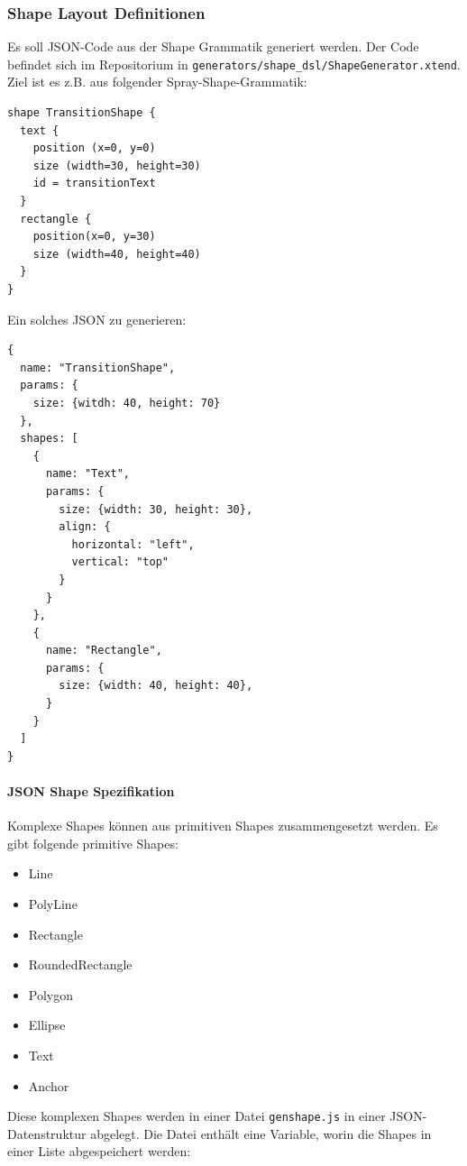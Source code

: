 \subsubsection{Shape Layout Definitionen}

Es soll JSON-Code aus der Shape Grammatik \citep[gemäß][]{sprayUser}
generiert werden. Der Code befindet sich im Repositorium in
{\tt generators/shape\_dsl/ShapeGenerator.xtend}.
Ziel ist es z.B. aus folgender Spray-Shape-Grammatik:

\begin{verbatim}
shape TransitionShape {
  text {
    position (x=0, y=0)
    size (width=30, height=30)
    id = transitionText
  }
  rectangle {
    position(x=0, y=30)
    size (width=40, height=40)  
  }
}
\end{verbatim}

\noindent Ein solches JSON zu generieren:

\begin{verbatim}
{
  name: "TransitionShape",
  params: {
    size: {witdh: 40, height: 70}
  },
  shapes: [
    {
      name: "Text",
      params: {
        size: {width: 30, height: 30},
        align: {
          horizontal: "left",
          vertical: "top"
        }
      }
    },
    {
      name: "Rectangle",
      params: {
        size: {width: 40, height: 40},
      }
    }
  ]
}
\end{verbatim}

\paragraph{JSON Shape Spezifikation}
Komplexe Shapes können aus primitiven Shapes zusammengesetzt werden.
Es gibt folgende primitive Shapes:

\begin{itemize}
  \item Line
  \item PolyLine
  \item Rectangle
  \item RoundedRectangle
  \item Polygon
  \item Ellipse
  \item Text
  \item Anchor
\end{itemize}

\noindent Diese komplexen Shapes werden in einer Datei {\tt genshape.js} in einer
JSON-Datenstruktur abgelegt. Die Datei enthält eine Variable, worin die
Shapes in einer Liste abgespeichert werden:

